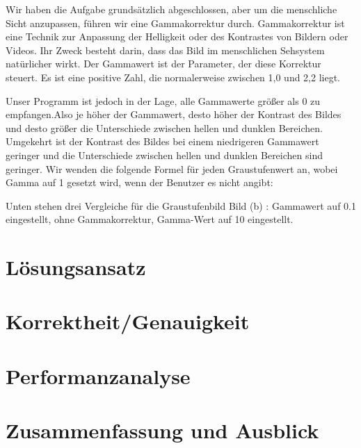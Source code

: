 \documentclass[course=erap]{aspdoc}
\begin{document}
\par
Wir haben die Aufgabe grundsätzlich abgeschlossen, aber um die menschliche Sicht anzupassen, führen wir eine Gammakorrektur durch. Gammakorrektur ist eine Technik zur Anpassung der Helligkeit oder des Kontrastes von Bildern oder Videos. Ihr Zweck besteht darin, dass das Bild im menschlichen Sehsystem natürlicher wirkt. Der Gammawert ist der Parameter, der diese Korrektur steuert. Es ist eine positive Zahl, die normalerweise zwischen 1,0 und 2,2 liegt.
\par
Unser Programm ist jedoch in der Lage, alle Gammawerte größer als 0 zu empfangen.Also je höher der Gammawert, desto höher der Kontrast des Bildes und desto größer die Unterschiede zwischen hellen und dunklen Bereichen. Umgekehrt ist der Kontrast des Bildes bei einem niedrigeren Gammawert geringer und die Unterschiede zwischen hellen und dunklen Bereichen sind geringer. Wir wenden die folgende Formel für jeden Graustufenwert an, wobei Gamma auf 1 gesetzt wird, wenn der Benutzer es nicht angibt:

\par
Unten stehen drei Vergleiche für die Graustufenbild Bild (b) : Gammawert auf 0.1 eingestellt, ohne Gammakorrektur, Gamma-Wert auf 10 eingestellt.






\section{Lösungsansatz}


\section{Korrektheit/Genauigkeit}



\section{Performanzanalyse}


\section{Zusammenfassung und Ausblick}

{}
\end{document}
